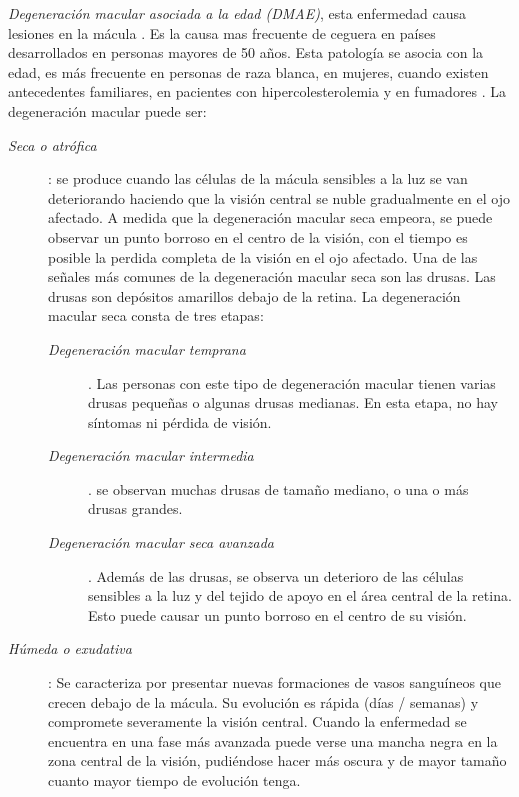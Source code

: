 \textit{Degeneraci\'on macular asociada a la edad (DMAE)}, esta enfermedad causa lesiones en la m\'acula \cite{frame1998comparison} \cite{forrester1997fully}. Es la causa mas frecuente de ceguera en pa\'ises desarrollados en personas mayores de 50 a\~nos. Esta patolog\'ia se asocia con la edad, es m\'as frecuente en personas de raza blanca, en mujeres, cuando existen antecedentes familiares, en pacientes con hipercolesterolemia y en fumadores \cite{nei:dmae} \cite{lim2012age}. La degeneraci\'on macular puede ser:
\begin{description}
	\item[\normalfont\textit{ Seca o atr\'ofica}]: se produce cuando las c\'elulas de la m\'acula sensibles a la luz se van deteriorando haciendo que la visi\'on central se nuble gradualmente en el ojo afectado. A medida que la degeneraci\'on macular seca empeora, se puede observar un punto borroso en el centro de la visi\'on, con el tiempo es posible la perdida completa de la visi\'on en el ojo afectado.  Una de las señales m\'as comunes de la degeneraci\'on macular seca son las drusas. Las drusas son dep\'ositos amarillos debajo de la retina. La degeneraci\'on macular seca consta de tres etapas:
\begin{description}
\item[\normalfont\textit{Degeneraci\'on macular temprana}]. Las personas con este tipo de degeneraci\'on macular tienen varias drusas pequeñas o algunas drusas medianas. En esta etapa, no hay s\'intomas ni p\'erdida de visi\'on.
\item[\normalfont\textit{Degeneraci\'on macular intermedia}]. se observan muchas drusas de tamaño mediano, o una o m\'as drusas grandes. 
\item[\normalfont\textit{Degeneraci\'on macular seca avanzada}]. Adem\'as de las drusas, se observa un deterioro de las c\'elulas sensibles a la luz y del tejido de apoyo en el \'area central de la retina. Esto puede causar un punto borroso en el centro de su visi\'on. 
\end{description}	
\item[\normalfont\textit{H\'umeda o exudativa}]: Se caracteriza por presentar nuevas formaciones de vasos sangu\'ineos que crecen debajo de la m\'acula. Su evoluci\'on es r\'apida (d\'ias / semanas) y compromete severamente la visi\'on central.
Cuando la enfermedad se encuentra en una fase m\'as avanzada puede verse una mancha negra en la zona central de la visi\'on, pudi\'endose hacer m\'as oscura y de mayor tama\~no cuanto mayor tiempo de evoluci\'on tenga. 
\end{description}

